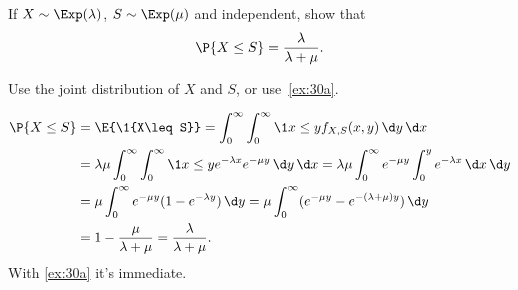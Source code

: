 \begin{exercise}\label{ex:3}
 If  
$X\sim \Exp(\lambda)$, $S\sim\Exp(\mu)$  and independent, show that
 \begin{equation*}
 \P{X\leq S} = \frac{\lambda}{\lambda+\mu}.
 \end{equation*}
\begin{hint}
Use the joint distribution of $X$ and $S$, or use~\cref{ex:30a}.
\end{hint}
\begin{solution}
\begin{align*}
 \P{X\leq S}
&= \E{\1{X\leq S}} = \int_0^\infty \int_0^\infty \1{x\leq y} f_{X,S}(x,y)\, \d y\,\d x\\
&= \lambda \mu \int_0^\infty \int_0^\infty \1{x\leq y} e^{-\lambda x} e^{-\mu y} \, \d y\,\d x
= \lambda \mu \int_0^\infty e^{-\mu y} \int_0^y e^{-\lambda x}\, \d x \, \d y \\
&= \mu \int_0^\infty e^{-\mu y} (1-e^{-\lambda y})\,\d y= \mu \int_0^\infty (e^{-\mu y} - e^{-(\lambda +\mu)y} ) \,\d y\\
&= 1 - \frac{\mu}{\lambda + \mu} = \frac{\lambda}{\lambda + \mu}.
\end{align*}
With \cref{ex:30a} it's immediate.

\end{solution}
\end{exercise}



